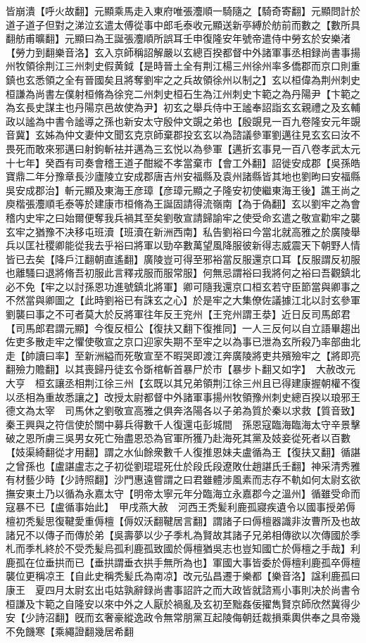 皆崩潰【呼火故翻】元顯乘馬走入東府唯張灋順一騎隨之【騎奇寄翻】元顯問計於道子道子但對之涕泣玄遣太傅從事中郎毛泰收元顯送新亭縛於舫前而數之【數所具翻舫甫曠翻】元顯曰為王誕張灋順所誤耳壬申復隆安年號帝遣侍中勞玄於安樂渚【勞力到翻樂音洛】玄入京師稱詔解嚴以玄總百揆都督中外諸軍事丞相録尚書事揚州牧領徐荆江三州刺史假黄鉞【是時晉土全有荆江楊三州徐州率多僑郡而京口則重鎮也玄悉領之全有晉國矣且將奪劉牢之之兵故領徐州以制之】玄以桓偉為荆州刺史桓謙為尚書左僕射桓脩為徐兖二州刺史桓石生為江州刺史卞範之為丹陽尹【卞範之為玄長史謀主也丹陽京邑故使為尹】初玄之舉兵侍中王謐奉詔詣玄玄親禮之及玄輔政以謐為中書令謐導之孫也新安太守殷仲文覬之弟也【殷覬見一百九卷隆安元年覬音冀】玄姊為仲文妻仲文聞玄克京師棄郡投玄玄以為諮議參軍劉邁往見玄玄曰汝不畏死而敢來邪邁曰射鉤斬袪并邁為三玄悦以為參軍【邁折玄事見一百八卷孝武太元十七年】癸酉有司奏會稽王道子酣縱不孝當棄市【會工外翻】詔徙安成郡【吳孫皓寶鼎二年分豫章長沙廬陵立安成郡唐吉州安福縣及袁州諸縣皆其地也劉昫曰安福縣吳安成郡治】斬元顯及東海王彦璋【彦璋元顯之子隆安初使繼東海王後】譙王尚之庾楷張灋順毛泰等於建康市桓脩為王誕固請得流嶺南【為于偽翻】玄以劉牢之為會稽内史牢之曰始爾便奪我兵禍其至矣劉敬宣請歸諭牢之使受命玄遣之敬宣勸牢之襲玄牢之猶豫不决移屯班瀆【班瀆在新洲西南】私告劉裕曰今當北就高雅之於廣陵舉兵以匡社稷卿能從我去乎裕曰將軍以勁卒數萬望風降服彼新得志威震天下朝野人情皆已去矣【降戶江翻朝直遙翻】廣陵豈可得至邪裕當反服還京口耳【反服謂反初服也離騷曰退將脩吾初服此言釋戎服而服常服】何無忌謂裕曰我將何之裕曰吾觀鎮北必不免【牢之以討孫恩功進號鎮北將軍】卿可隨我還京口桓玄若守臣節當與卿事之不然當與卿圖之【此時劉裕已有誅玄之心】於是牢之大集僚佐議據江北以討玄參軍劉襲曰事之不可者莫大於反將軍往年反王兖州【王兖州謂王㳟】近日反司馬郎君【司馬郎君謂元顯】今復反桓公【復扶又翻下復推同】一人三反何以自立語畢趨出佐吏多散走牢之懼使敬宣之京口迎家失期不至牢之以為事已泄為玄所殺乃率部曲北走【帥讀曰率】至新洲縊而死敬宣至不暇哭即渡江奔廣陵將吏共殯殮牢之【將即亮翻殮力贍翻】以其喪歸丹徒玄令斲棺斬首暴尸於市【暴步卜翻又如字】　大赦改元大亨　桓玄讓丞相荆江徐三州【玄既以其兄弟領荆江徐三州且已得建康握朝權不復以丞相為重故悉讓之】改授太尉都督中外諸軍事揚州牧領豫州刺史總百揆以琅邪王德文為太宰　司馬休之劉敬宣高雅之俱奔洛陽各以子弟為質於秦以求救【質音致】秦王興與之符信使於關中募兵得數千人復還屯彭城間　孫恩寇臨海臨海太守辛景擊破之恩所虜三吳男女死亡殆盡恩恐為官軍所獲乃赴海死其黨及妓妾從死者以百數【妓渠綺翻從才用翻】謂之水仙餘衆數千人復推恩妹夫盧循為王【復扶又翻】循諶之曾孫也【盧諶盧志之子初從劉琨琨死仕於段氏段遼敗仕趙諶氏壬翻】神采清秀雅有材藝少時【少詩照翻】沙門惠遠嘗謂之曰君雖體涉風素而志存不軌如何太尉玄欲撫安東土乃以循為永嘉太守【明帝太寧元年分臨海立永嘉郡今之溫州】循雖受命而寇暴不已【盧循事始此】　甲戌燕大赦　河西王秃髪利鹿孤寢疾遺令以國事授弟傉檀初秃髪思復鞬愛重傉檀【傉奴沃翻鞬居言翻】謂諸子曰傉檀器識非汝曹所及也故諸兄不以傳子而傳於弟【吳壽夢以少子季札為賢故其諸子兄弟相傳欲以次傳國於季札而季札終於不受禿髪烏孤利鹿孤致國於傉檀猶吳志也豈知國亡於傉檀之手哉】利鹿孤在位垂拱而已【垂拱謂垂衣拱手無所為也】軍國大事皆委於傉檀利鹿孤卒傉檀襲位更稱凉王【自此史稱秃髪氏為南凉】改元弘昌遷于樂都【樂音洛】諡利鹿孤曰康王　夏四月太尉玄出屯姑孰辭録尚書事詔許之而大政皆就諮焉小事則决於尚書令桓謙及卞範之自隆安以來中外之人厭於禍亂及玄初至黜姦佞擢雋賢京師欣然冀得少安【少詩沼翻】旣而玄奢豪縱逸政令無常朋黨互起陵侮朝廷裁損乘輿供奉之具帝幾不免饑寒【乘繩證翻幾居希翻